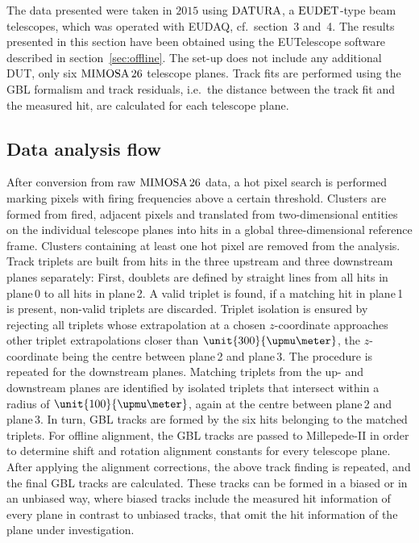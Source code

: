 
The data presented were taken in $2015$ using $\textrm{DATURA}$, a $\textrm{EUDET}$-type beam telescopes, which was operated with EUDAQ, cf.~section~3 and~4. 
The results presented in this section have been obtained using the EUTelescope software described in section~\ref{sec:offline}.
The set-up does not include any additional DUT, only six $\textrm{MIMOSA\,26}$ telescope planes. 
Track fits are performed using the GBL formalism and track residuals, i.e.\ the distance between the track fit and the measured hit,
 are calculated for each telescope plane. 
 

\subsection{Data analysis flow}
\label{sec:datura-nodut}

After conversion from raw $\textrm{MIMOSA\,26}$ data, a hot pixel search is performed marking pixels with firing frequencies above a certain threshold.
Clusters are formed from fired, adjacent pixels and translated from two-dimensional entities on the individual telescope planes into hits in a global three-dimensional reference frame.
Clusters containing at least one hot pixel are removed from the analysis. 
Track triplets are built from hits in the three upstream and three downstream planes separately: 
First, doublets are defined by straight lines from all hits in plane\,0 to all hits in plane\,2. 
A valid triplet is found, if a matching hit in plane\,1 is present, non-valid triplets are discarded.  
Triplet isolation is ensured by rejecting all triplets whose extrapolation at a chosen $z$-coordinate approaches other triplet extrapolations closer than $\unit{300}{\upmu\meter}$,
 the $z$-coordinate being the centre between plane\,2 and plane\,3. 
The procedure is repeated for the downstream planes. 
Matching triplets from the up- and downstream planes are identified by isolated triplets that intersect within a radius of $\unit{100}{\upmu\meter}$, again at the centre between plane\,2 and plane\,3. 
In turn, GBL tracks are formed by the six hits belonging to the matched triplets. 
For offline alignment, the GBL tracks are passed to Millepede-II in order to determine shift and rotation alignment constants for every telescope plane.
After applying the alignment corrections, the above track finding is repeated, and the final GBL tracks are calculated. 
These tracks can be formed in a \textrm{biased} or in an \textrm{unbiased} way, where biased tracks include the measured hit information of every plane in contrast to unbiased tracks,
 that omit the hit information of the plane under investigation. 

